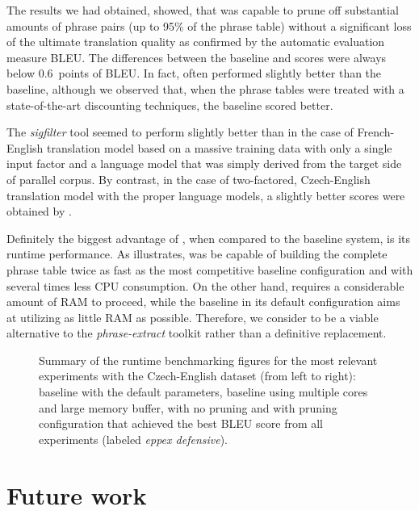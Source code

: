 The results we had obtained, showed, that \eppex{} was capable to prune off
substantial amounts of phrase pairs (up to 95\% of the phrase table) without
a significant loss of the ultimate translation quality as confirmed by the
automatic evaluation measure BLEU.
The differences between the baseline and \eppex{} scores were always below
0.6~points of BLEU.
In fact, \eppex{} often performed slightly better than the baseline,
although we observed that, when the phrase tables were treated with a
state-of-the-art discounting techniques, the baseline scored better.

The \emph{sigfilter} tool seemed to perform slightly better than \eppex{}
in the case of French-English translation model based on a massive training
data with only a single input factor and a language model that was simply
derived from the target side of parallel corpus.
By contrast, in the case of two-factored, Czech-English translation model with
the proper language models, a slightly better scores were obtained by \eppex{}.

Definitely the biggest advantage of \eppex{}, when compared to the baseline
system, is its runtime performance.
As  illustrates, \eppex{} was be capable of building
the complete phrase table twice as fast as the most competitive baseline
configuration and with several times less CPU consumption.
On the other hand, \eppex{} requires a considerable amount of RAM to proceed,
while the baseline in its default configuration aims at utilizing as little RAM
as possible.
Therefore, we consider \eppex{} to be a viable alternative to the \emph{phrase-extract}
toolkit rather than a definitive replacement.

\begin{figure}[!htb]
  \centering
  
  \caption{
    Summary of the runtime benchmarking figures for the most relevant experiments
    with the Czech-English dataset (from left to right): baseline with the default
    parameters, baseline using multiple cores and large memory buffer, \eppex{}
    with no pruning and \eppex{} with pruning configuration that achieved the best
    BLEU score from all experiments (labeled \emph{eppex defensive}).
  }
  \label{fig:conclusions-cs-en}
\end{figure}

\section{Future work}

